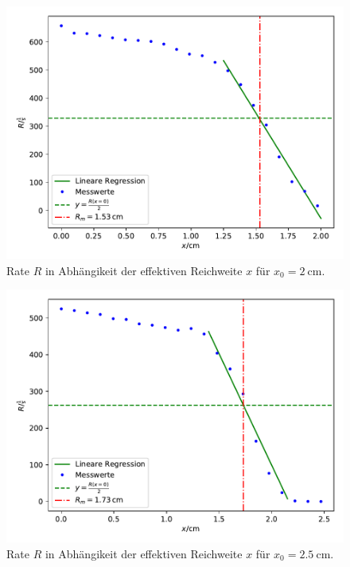 \begin{figure}
  \centering
  \includegraphics[scale=0.6]{Messung1a.pdf}
  \caption{Rate $R$ in Abhängikeit der effektiven Reichweite $x$ für $x_0=\SI{2}{\centi\meter}$.}
  \label{abb:2}
\end{figure}
\begin{figure}
  \centering
  \includegraphics[scale=0.6]{Messung2a.pdf}
  \caption{Rate $R$ in Abhängikeit der effektiven Reichweite $x$ für $x_0=\SI{2,5}{\centi\meter}$.}
  \label{abb:3}
\end{figure}
